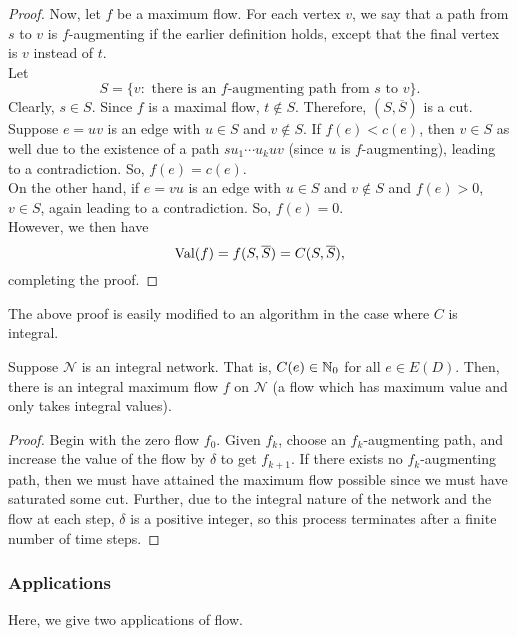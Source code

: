 \begin{proof}
				Now, let $f$ be a maximum flow. For each vertex $v$, we say that a path from $s$ to $v$ is $f$-augmenting if the earlier definition holds, except that the final vertex is $v$ instead of $t$.\\
				Let
				\[ S = \{ v: \text{ there is an $f$-augmenting path from $s$ to $v$} \}. \]
				Clearly, $s\in S$. Since $f$ is a maximal flow, $t\not\in S$. Therefore, $(S,\overline{S})$ is a cut.\\
				Suppose $e = uv$ is an edge with $u \in S$ and $v \not\in S$. If $f(e) < c(e)$, then $v\in S$ as well due to the existence of a path $s u_1 \cdots u_k u v$ (since $u$ is $f$-augmenting), leading to a contradiction. So, $f(e) = c(e)$.\\
				On the other hand, if $e = vu$ is an edge with $u \in S$ and $v \not\in S$ and $f(e) > 0$, $v \in S$, again leading to a contradiction. So, $f(e) = 0$.\\
				However, we then have
				\[ \operatorname{Val}(f) = f(S,\overline{S}) = C(S,\overline{S}), \]
				completing the proof.
			\end{proof}

			The above proof is easily modified to an algorithm in the case where $C$ is integral.

			\begin{fcor}
				\label{integral network integral maxflow}
				Suppose $\mathcal{N}$ is an integral network. That is, $C(e) \in \mathbb{N}_0$ for all $e \in E(D)$. Then, there is an integral maximum flow $f$ on $\mathcal{N}$ (a flow which has maximum value and only takes integral values).
			\end{fcor}
			\begin{proof}
				Begin with the zero flow $f_0$. Given $f_k$, choose an $f_k$-augmenting path, and increase the value of the flow by $\delta$ to get $f_{k+1}$. If there exists no $f_k$-augmenting path, then we must have attained the maximum flow possible since we must have saturated some cut. Further, due to the integral nature of the network and the flow at each step, $\delta$ is a positive integer, so this process terminates after a finite number of time steps.
			\end{proof}

		\subsubsection{Applications}
		\label{subsubsec: applications of max-flow}

			Here, we give two applications of flow.\\

